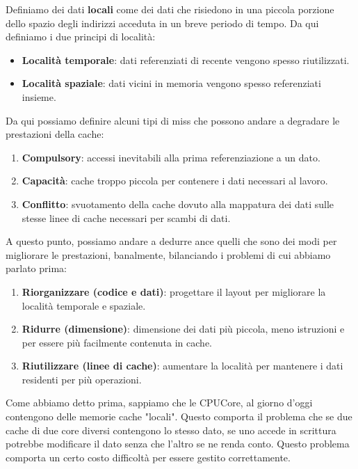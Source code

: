 Definiamo dei dati \textbf{locali} come dei dati che risiedono in una piccola porzione dello spazio degli indirizzi acceduta in un breve periodo di tempo. Da qui definiamo i due principi di località:
\begin{itemize}
    \item \textbf{Località temporale}: dati referenziati di recente vengono spesso riutilizzati.
    \item \textbf{Località spaziale}: dati vicini in memoria vengono spesso referenziati insieme.
\end{itemize}
Da qui possiamo definire alcuni tipi di miss che possono andare a degradare le prestazioni della cache:
\begin{enumerate}
    \item \textbf{Compulsory}: accessi inevitabili alla prima referenziazione a un dato.
    \item \textbf{Capacità}: cache troppo piccola per contenere i dati necessari al lavoro. 
    \item \textbf{Conflitto}: svuotamento della cache dovuto alla mappatura dei dati sulle stesse linee di cache necessari per scambi di dati.
\end{enumerate}

A questo punto, possiamo andare a dedurre ance quelli che sono dei modi per migliorare le prestazioni, banalmente, bilanciando i problemi di cui abbiamo parlato prima:
\begin{enumerate}
    \item \textbf{Riorganizzare (codice e dati)}: progettare il layout per migliorare la località temporale e spaziale.
    \item \textbf{Ridurre (dimensione)}: dimensione dei dati più piccola, meno istruzioni e per essere più facilmente contenuta in cache.
    \item \textbf{Riutilizzare (linee di cache)}: aumentare la località per mantenere i dati residenti per più operazioni.
\end{enumerate}

Come abbiamo detto prima, sappiamo che le CPU\/Core, al giorno d'oggi contengono delle memorie cache "locali". Questo comporta il problema che se due cache di due core diversi contengono lo stesso dato, se uno accede in scrittura potrebbe modificare il dato senza che l'altro se ne renda conto.
Questo problema comporta un certo costo\/ difficoltà per essere gestito correttamente. 

